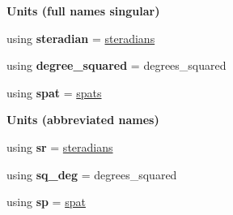 \begin{Indent}{\bf Units (full names singular)}\par
\begin{DoxyCompactItemize}
\item 
\hypertarget{namespaceunits_1_1solid__angle_a8be364cdaef8de3ffe3a2b7c5ebde814}{}using {\bfseries steradian} = \hyperlink{structunits_1_1unit}{steradians}\label{namespaceunits_1_1solid__angle_a8be364cdaef8de3ffe3a2b7c5ebde814}

\item 
\hypertarget{namespaceunits_1_1solid__angle_a0b4bc1b2702e2c23d58da8ffe83ac614}{}using {\bfseries degree\+\_\+squared} = degrees\+\_\+squared\label{namespaceunits_1_1solid__angle_a0b4bc1b2702e2c23d58da8ffe83ac614}

\item 
\hypertarget{namespaceunits_1_1solid__angle_a31ba466c72eb0566691eedef069f5971}{}using {\bfseries spat} = \hyperlink{structunits_1_1unit}{spats}\label{namespaceunits_1_1solid__angle_a31ba466c72eb0566691eedef069f5971}

\end{DoxyCompactItemize}
\end{Indent}
\begin{Indent}{\bf Units (abbreviated names)}\par
\begin{DoxyCompactItemize}
\item 
\hypertarget{namespaceunits_1_1solid__angle_a9c990bf8e5af902524839f3c652718f8}{}using {\bfseries sr} = \hyperlink{structunits_1_1unit}{steradians}\label{namespaceunits_1_1solid__angle_a9c990bf8e5af902524839f3c652718f8}

\item 
\hypertarget{namespaceunits_1_1solid__angle_aea3f4170204c908c77d681bb8a98d5e2}{}using {\bfseries sq\+\_\+deg} = degrees\+\_\+squared\label{namespaceunits_1_1solid__angle_aea3f4170204c908c77d681bb8a98d5e2}

\item 
\hypertarget{namespaceunits_1_1solid__angle_a7d03ab91e303de9c4689474b9847b526}{}using {\bfseries sp} = \hyperlink{structunits_1_1unit}{spat}\label{namespaceunits_1_1solid__angle_a7d03ab91e303de9c4689474b9847b526}

\end{DoxyCompactItemize}
\end{Indent}
